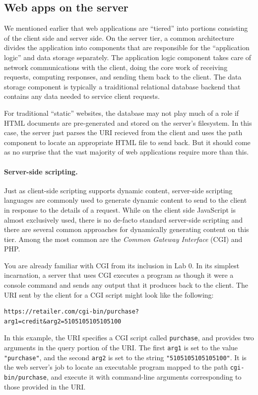 \documentclass[11pt,twoside]{scrartcl}
\begin{document}
\subsection{Web apps on the server}

We mentioned earlier that web applications are ``tiered'' into portions consisting of the client side and server side. On the server tier, a common architecture divides the application into components that are responsible for the ``application logic'' and data storage separately. The application logic component takes care of network communications with the client, doing the core work of receiving requests, computing responses, and sending them back to the client. The data storage component is typically a traiditional relational database backend that contains any data needed to service client requests.

For traditional ``static'' websites, the database may not play much of a role if HTML documents are pre-generated and stored on the server's filesystem. In this case, the server just parses the URI recieved from the client and uses the path component to locate an appropriate HTML file to send back. But it should come as no surprise that the vast majority of web applications require more than this.

\paragraph{Server-side scripting.}
Just as client-side scripting supports dynamic content, server-side scripting languages are commonly used to generate dynamic content to send to the client in response to the details of a request. While on the client side JavaScript is almost exclusively used, there is no de-facto standard server-side scripting and there are several common approaches for dynamically generating content on this tier. Among the most common are the \emph{Common Gateway Interface} (CGI) and PHP.

You are already familiar with CGI from its inclusion in Lab 0. In its simplest incarnation, a server that uses CGI executes a program as though it were a console command and sends any output that it produces back to the client. The URI sent by the client for a CGI script might look like the following:
\begin{verbatim}
https://retailer.com/cgi-bin/purchase?arg1=credit&arg2=5105105105105100
\end{verbatim}
In this example, the URI specifies a CGI script called \verb'purchase', and provides two arguments in the query portion of the URI. The first \verb'arg1' is set to the value \verb'"purchase"', and the second \verb'arg2' is set to the string \verb'"5105105105105100"'. It is the web server's job to locate an executable program mapped to the path \verb'cgi-bin/purchase', and execute it with command-line arguments corresponding to those provided in the URI.
\end{document}
